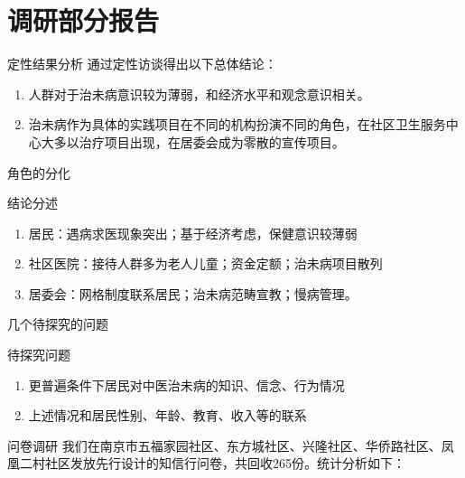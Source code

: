 \section{调研部分报告}
\begin{frame}{定性结果分析}
通过定性访谈得出以下总体结论：
\begin{enumerate}
    \item 人群对于治未病意识较为薄弱，和经济水平和观念意识相关。
    \item 治未病作为具体的实践项目在不同的机构扮演不同的角色，在社区卫生服务中心大多以治疗项目出现，在居委会成为零散的宣传项目。
\end{enumerate}
\end{frame}
\begin{frame}{角色的分化}
\begin{alertblock}{结论分述}
\begin{enumerate}
\item 居民：遇病求医现象突出；基于经济考虑，保健意识较薄弱

\item 社区医院：接待人群多为老人儿童；资金定额；治未病项目散列

\item 居委会：网格制度联系居民；治未病范畴宣教；慢病管理。
\end{enumerate}
\end{alertblock}
\end{frame}
\begin{frame}{几个待探究的问题}
\begin{exampleblock}{待探究问题}

\begin{enumerate}
    \item 更普遍条件下居民对中医治未病的知识、信念、行为情况
    \item 上述情况和居民性别、年龄、教育、收入等的联系
\end{enumerate}\end{exampleblock}
\begin{alertblock}{问卷调研}
    我们在南京市五福家园社区、东方城社区、兴隆社区、华侨路社区、凤凰二村社区发放先行设计的知信行问卷，共回收265份。统计分析如下：
\end{alertblock}
\end{frame}

